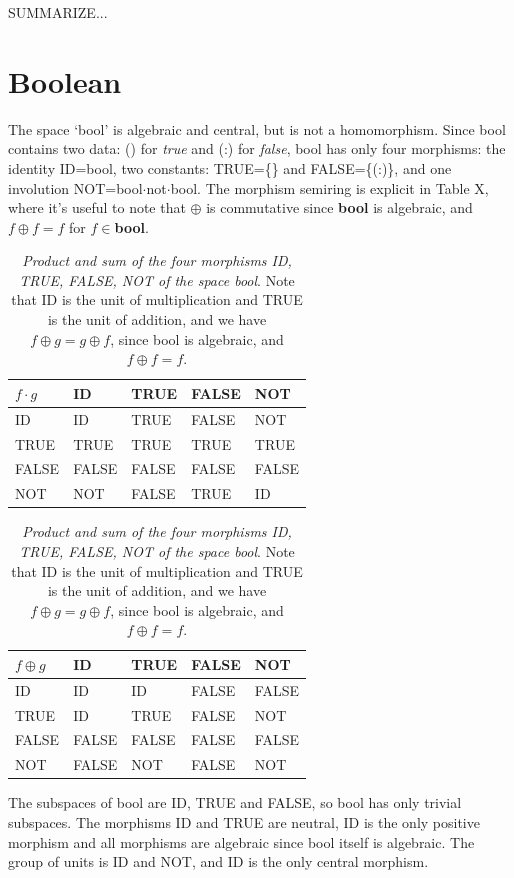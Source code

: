 \documentclass[11pt]{article}
\begin{document}
SUMMARIZE...

\section{Boolean} 

      The space `bool' is algebraic and central, but is not a homomorphism.  Since bool contains two data:  () for {\it true} and (:) for {\it false},   
 bool has only four morphisms:  the identity ID=bool, two constants: TRUE=\{\} and FALSE=\{(:)\}, and one involution 
 NOT=bool$\cdot$not$\cdot$bool.  The morphism semiring is explicit in Table X, where it's useful to note that $\oplus$ is commutative since {\bf bool} is 
 algebraic, and $f\oplus f=f$ for $f\in${\bf bool}.  

\begin{table}
\begin{tabular}{| l | l | l | l | l |  }
$f\cdot g$ & ID & TRUE & FALSE & NOT  \\
\hline
ID &  ID & TRUE & FALSE &  NOT \\
TRUE & TRUE & TRUE  & TRUE & TRUE \\
FALSE & FALSE  & FALSE & FALSE & FALSE   \\
NOT & NOT & FALSE & TRUE & ID \\
\hline
\end{tabular}
\begin{tabular}{| l | l | l | l | l |  }
$f\oplus g$ & ID & TRUE & FALSE & NOT  \\
\hline
ID &  ID & ID & FALSE & FALSE \\
TRUE & ID & TRUE  & FALSE & NOT \\
FALSE & FALSE  & FALSE & FALSE & FALSE   \\
NOT & FALSE & NOT & FALSE & NOT \\
\hline
\end{tabular}
\caption{{\it Product and sum of the four morphisms ID, TRUE, FALSE, NOT of the space bool}.  Note that ID is the unit of multiplication and TRUE is the 
unit of addition, and we have $f\oplus g=g\oplus f$, since bool is algebraic, and $f\oplus f=f$.}
\end{table}

The subspaces of bool are ID, TRUE and FALSE, so bool has only trivial subspaces.  The morphisms ID and TRUE are neutral, ID is the only positive 
morphism and all morphisms are algebraic since bool itself is algebraic.  The group of units is ID and NOT, and ID is the only central morphism. 
\end{document}
